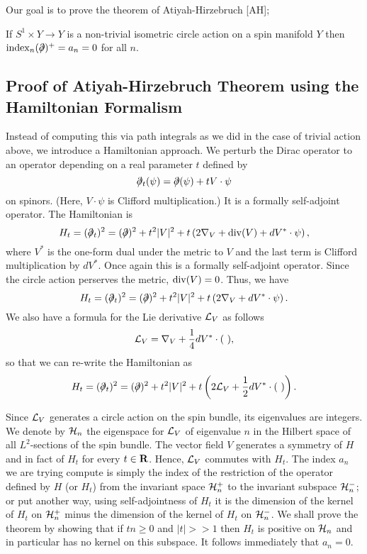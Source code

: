Our goal is to prove the theorem of Atiyah-Hirzebruch [AH];

\begin{theorem}
If $S^1\times Y\to Y$ is a non-trivial isometric circle action on a
spin manifold 
$Y$ then ${\rm index}_n(\dirac)^+=a_n=0$ for all $n$.
\end{theorem}

\subsection{Proof of Atiyah-Hirzebruch Theorem using the Hamiltonian
Formalism}

Instead of computing this via path integrals as we did in the case of
trivial action above, we introduce a Hamiltonian approach.  We perturb
the Dirac 
operator to an operator depending on a real parameter $t$ defined by
$$\dirac_t(\psi )=\dirac(\psi)+tV\cdot \psi$$
on spinors. (Here, $V\cdot\psi$ is Clifford
multiplication.)
It is a formally self-adjoint operator. 
The Hamiltonian is 
$$H_t=(\dirac_t)^2=(\dirac)^2+t^2|V|^2+t\left(2\nabla_V+{\rm
div}(V)+dV^*\cdot \psi\right),$$
where $V^*$ is the one-form dual under the metric to $V$ and the last
term is Clifford multiplication by $dV^*$.
Once again this is a formally self-adjoint operator.
Since the circle action perserves the metric, ${\rm div}(V)=0$.
Thus, we have
$$H_t=(\dirac_t)^2=(\dirac)^2+t^2|V|^2+t\left(2\nabla_V+dV^*\cdot
\psi \right).$$
We also have a formula for the Lie derivative ${\cal L}_V$ as follows 
$${\cal L}_V=\nabla_V+\frac{1}{4}dV^*\cdot(\ ),$$
so that we can re-write the Hamiltonian as
$$H_t= (\dirac_t)^2=(\dirac)^2+t^2|V|^2+t\left(2{\cal
L}_V+\frac{1}{2} dV^*\cdot(\ )\right).$$

Since ${\cal L}_V$ generates a circle action on the spin bundle, its
eigenvalues are integers.
We denote by ${\cal H}_n$ the eigenspace for ${\cal L}_V$ of
eigenvalue $n$ in the Hilbert space of all
$L^2$-sections of the spin bundle. 
The vector field $V$ generates a symmetry of $H$ and in fact of $H_t$
for every $t\in {\bf R}$.  Hence, ${\cal
L}_V$ commutes with $H_t$. The index $a_n$ we are trying compute is simply
the index of the restriction of the operator defined by  $H$ (or
$H_t$)  from the invariant space  
${\cal H}^+_n$ to the invariant subspace ${\cal H}^-_n$; or put 
another way, using self-adjointness of $H_t$ it is the dimension 
of the kernel of $H_t$ on ${\cal H}^+_n$ minus the
dimension of the kernel of $H_t$ on ${\cal H}^-_n$.
We shall prove the theorem by showing that if $tn\ge 0$ and $|t|>>1$ then
$H_t$ is positive on
${\cal H}_n$ and in particular has no kernel on this subspace.
It follows immediately that $a_n=0$.

